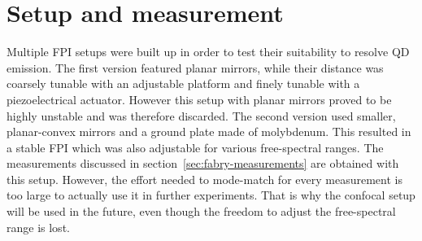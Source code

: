 \newpage


\section{Setup and measurement}

Multiple \ac{FPI} setups were built up in order to test their suitability to resolve \ac{QD} emission.
The first version featured planar mirrors, while their distance was coarsely tunable with an adjustable platform and finely tunable with a piezoelectrical actuator.
However this setup with planar mirrors proved to be highly unstable and was therefore discarded.
The second version used smaller, planar-convex mirrors and a ground plate made of molybdenum.
This resulted in a stable \ac{FPI} which was also adjustable for various free-spectral ranges.
The measurements discussed in section~\ref{sec:fabry-measurements} are obtained with this setup.
However, the effort needed to mode-match for every measurement is too large to actually use it in further experiments.
That is why the confocal setup will be used in the future, even though the freedom to adjust the free-spectral range is lost.

